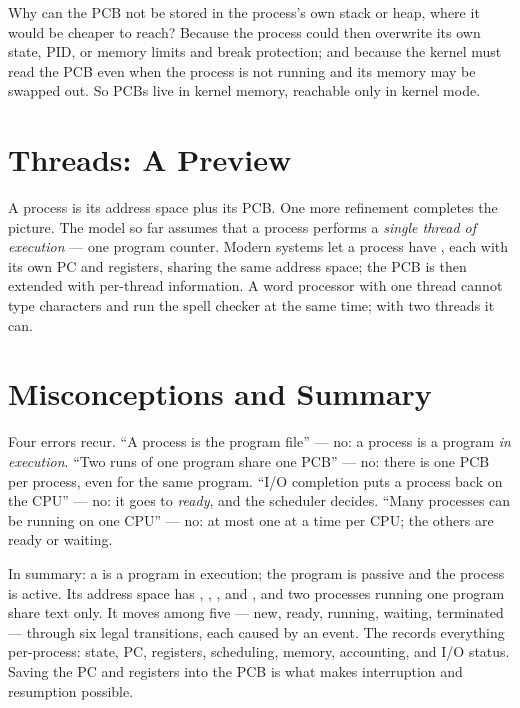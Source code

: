 \documentclass[11pt]{article}
\begin{document}
Why can the PCB not be stored in the process's own stack or heap, where it
would be cheaper to reach? Because the process could then overwrite its own
state, PID, or memory limits and break protection; and because the kernel must
read the PCB even when the process is not running and its memory may be swapped
out. So PCBs live in kernel memory, reachable only in kernel mode.

\section{Threads: A Preview}

\noindent{}

A process is its address space plus its PCB. One more refinement completes the
picture. The model so far assumes that a process performs a \emph{single thread
of execution} --- one program counter. Modern systems let a process have
, each with its own PC and registers, sharing the same
address space; the PCB is then extended with per-thread information. A word
processor with one thread cannot type characters and run the spell checker at
the same time; with two threads it can.

\section{Misconceptions and Summary}

Four errors recur. ``A process is the program file'' --- no: a process is a
program \emph{in execution}. ``Two runs of one program share one PCB'' --- no:
there is one PCB per process, even for the same program. ``I/O completion puts a
process back on the CPU'' --- no: it goes to \emph{ready}, and the scheduler
decides. ``Many processes can be running on one CPU'' --- no: at most one at a
time per CPU; the others are ready or waiting.

In summary: a  is a program in execution; the program is passive
and the process is active. Its address space has , ,
, and , and two processes running one program share text
only. It moves among five  --- new, ready, running, waiting,
terminated --- through six legal transitions, each caused by an event. The
 records everything per-process: state, PC, registers, scheduling,
memory, accounting, and I/O status. Saving the PC and registers into the PCB is
what makes interruption and resumption possible.
\end{document}
